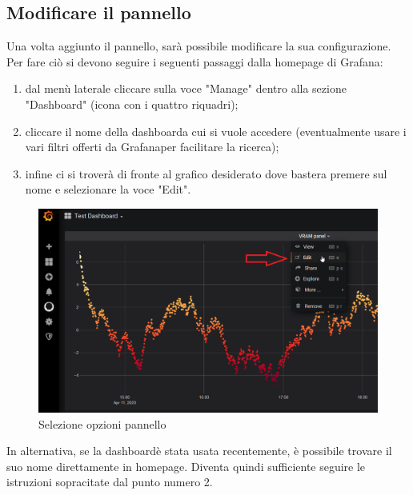     \subsection{Modificare il pannello}
        Una volta aggiunto il pannello, sarà possibile modificare la sua configurazione. Per fare ciò si devono seguire i seguenti passaggi dalla homepage di Grafana\glo:
        \begin{enumerate}
            \item dal menù laterale cliccare sulla voce "Manage" dentro alla sezione "Dashboard" (icona con i quattro riquadri);
            \item cliccare il nome della dashboard\glosp a cui si vuole accedere (eventualmente usare i vari filtri offerti da Grafana\glosp per facilitare la ricerca);
            \item infine ci si troverà di fronte al grafico desiderato dove bastera premere sul nome e selezionare la voce "Edit".
        \end{enumerate}
        \begin{figure}[H]
            \includegraphics[width=\textwidth,height=\textheight,keepaspectratio]{img/modificare_pannello.png}
            \caption{Selezione opzioni pannello}
        \end{figure}
        In alternativa, se la dashboard\glosp è stata usata recentemente, è possibile trovare il suo nome direttamente in homepage. Diventa quindi sufficiente seguire le istruzioni sopracitate dal punto numero 2.
